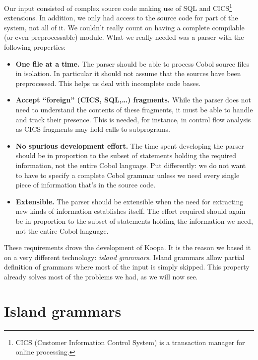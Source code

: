 \documentclass[a4paper]{article}
\begin{document}
Our input consisted of complex source code making use of SQL and CICS\footnote{\scriptsize CICS (Customer Information Control System) is a transaction manager for online processing.} extensions. In addition, we only had access to the source code for part of the system, not all of it. We couldn't really count on having a complete compilable (or even preprocessable) module. What we really needed was a parser with the following properties:
\begin{itemize}
    \item \textbf{One file at a time.} The parser should be able to process Cobol source files in isolation. In particular it should not assume that the sources have been preprocessed. This helps us deal with incomplete code bases.
    \item \textbf{Accept ``foreign'' (CICS, SQL,\ldots) fragments.} While the parser does not need to understand the contents of these fragments, it must be able to handle and track their presence. This is needed, for instance, in control flow analysis as CICS fragments may hold calls to subprograms.
    \item \textbf{No spurious development effort.} The time spent developing the parser should be in proportion to the subset of statements holding the required information, not the entire Cobol language. Put differently: we do not want to have to specify a complete Cobol grammar unless we need every single piece of information that's in the source code.
    \item \textbf{Extensible.} The parser should be extensible when the need for extracting new kinds of information establishes itself. The effort required should again be in proportion to the subset of statements holding the information we need, not the entire Cobol language.
\end{itemize}

These requirements drove the development of Koopa. It is the reason we based it on a very different technology: \emph{island grammars}. Island grammars allow partial definition of grammars where most of the input is simply skipped. This property already solves most of the problems we had, as we will now see.

\section{Island grammars}
\label{islandgrammars}
\end{document}
